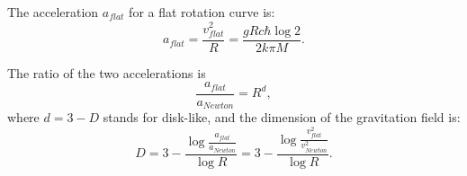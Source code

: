 \documentclass[12pt]{article}
\begin{document}
The acceleration $a_{\textit{flat}}$ for a flat rotation curve is:
\begin{equation}
a_{\textit{flat}} = \frac{v_{\textit{flat}}^2}{R} = \frac{g R c \hbar \log 2}{2 k \pi M}.
\end{equation}

The ratio of the two accelerations is
\begin{equation}
\frac{a_{\textit{flat}}}{a_{\textit{Newton}}} = R^{d}, 
\end{equation}
where $d = 3 - D$ stands for disk-like, and the dimension of the gravitation field is:
\begin{equation}
D = 3 - \frac{\log \frac{a_{\textit{flat}}}{a_{\textit{Newton}}}}{\log R} = 3 - \frac{\log \frac{v_{\textit{flat}}^2}{v_{\textit{Newton}}^2}}{\log R}.
\end{equation}
\end{document}
